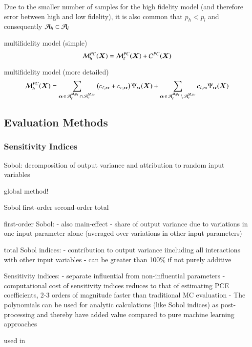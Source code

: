 Due to the smaller number of samples for the high fidelity model (and therefore error between high and low fidelity), it is also
common that $p_h < p_l$ and consequently $\mathcal{A}_h \subset \mathcal{A}_l$

multifidelity model (simple)
\begin{equation}
    \mathcal{M}_h^{PC}(\bm X) = \mathcal{M}_\ell^{PC}(\bm X) + \mathcal{C}^{PC}(\bm X)
\end{equation}

multifidelity model (more detailed)
\begin{equation}
    \mathcal{M}_h^{PC} (\bm X) = \sum_{{\bm{\alpha}}\,\in\,\mathcal{A}_\ell^{M,p_\ell} \,\cap\, \mathcal{A}_c^{M,p_c}}
    \left(
     c_{\ell,{\bm{\alpha}}} + c_{c,{\bm{\alpha}}}
    \right) \Psi_{\bm{\alpha}}(\bm X) + 
    \sum_{{\bm{\alpha}}\,\in\,\mathcal{A}_\ell^{M,p_\ell} \,\setminus\, \mathcal{A}_c^{M,p_c}}
    c_{\ell,{\bm{\alpha}}} \Psi_{\bm{\alpha}}(\bm X)
\end{equation}

\subsection{Evaluation Methods}
\label{sec:evaluationmethods}

\subsubsection{Sensitivity Indices}

Sobol: decomposition of output variance and attribution to random input variables

global method!

Sobol first-order second-order total

first-order Sobol:
- also main-effect
- share of output variance due to variations in one input parameter alone (averaged over variations in other input parameters)

total Sobol indices:
- contribution to output variance iincluding all interactions with other input variables
- can be greater than 100\% if not purely additive

Sensitivity indices:
- separate influential from non-influential parameters
- computational cost of sensitivity indices reduces to that of estimating PCE coefficients, 2-3 orders of magnitude faster than traditional MC evaluation \cite{sudret_global_2008}
- The polynomials can be used for analytic calculations (like Sobol indices) as post-processing and thereby have added value compared to pure machine learning approaches

used in \cite{trondle_trade-offs_2020,mavromatidis_uncertainty_2018}


